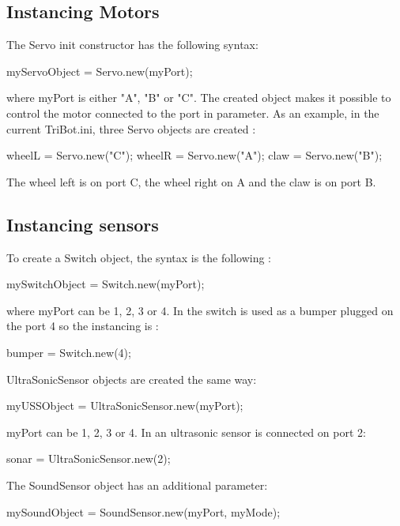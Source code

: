 \subsection{Instancing Motors}
The Servo init constructor has the following syntax:
\begin{urbiunchecked}
  myServoObject = Servo.new(myPort);
\end{urbiunchecked}

where myPort is either "A", "B" or "C". The created object makes it possible to
control the motor connected to the port in parameter.
As an example, in the current TriBot.ini, three Servo objects are created :
\begin{urbiunchecked}
  wheelL = Servo.new("C");
  wheelR = Servo.new("A");
  claw = Servo.new("B");
\end{urbiunchecked}

The wheel left is on port C, the wheel right on A and the claw is on port B.

\subsection{Instancing sensors}
To create a Switch object, the syntax is the following :
\begin{urbiunchecked}
  mySwitchObject = Switch.new(myPort);
\end{urbiunchecked}

where myPort can be 1, 2, 3 or 4.
In  the switch is used as a bumper plugged on the port 4 so the
instancing is :
\begin{urbiunchecked}
  bumper  = Switch.new(4);
\end{urbiunchecked}

UltraSonicSensor objects are created the same way:
\begin{urbiunchecked}
  myUSSObject = UltraSonicSensor.new(myPort);
\end{urbiunchecked}

myPort can be 1, 2, 3 or 4.
In  an ultrasonic sensor is connected on port 2:
\begin{urbiunchecked}
  sonar = UltraSonicSensor.new(2);
\end{urbiunchecked}

The SoundSensor object has an additional parameter:
\begin{urbiunchecked}
  mySoundObject = SoundSensor.new(myPort, myMode);
\end{urbiunchecked}

